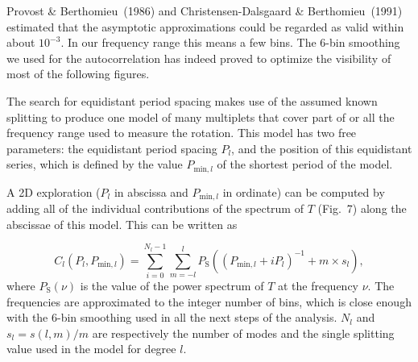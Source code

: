 \documentclass[bibyear]{aa}
\begin{document}
Provost \& Berthomieu~(1986) and Christensen-Dalsgaard \& Berthomieu~(1991) estimated that the asymptotic approximations could be regarded as valid within about $10^{-3}$. In our frequency range this means a few bins. The 6-bin smoothing we used for the autocorrelation has indeed proved to optimize the visibility of most of the following figures.

The search for equidistant period spacing makes use of the assumed known splitting to produce one model of many multiplets that
cover part of or all the frequency range used to measure the rotation. This model has two free parameters: the equidistant period spacing $P_l$, 
and the position of this equidistant series, which is defined by the value $P_{\mathrm{min},l}$ of the shortest period of the model.

A 2D exploration ($P_l$ in abscissa and  $P_{\mathrm{min},l}$ in ordinate) can be computed
 by adding all of the individual contributions of the spectrum  of $T$ (Fig.~7)
along the abscissae of this model. This can be written as  

\begin{equation}\label{eq:Cl}
C_l(P_l,P_{\mathrm{min},l}) = \sum_{i=0}^{N_l-1}\sum_{m=-l}^l P_\mathrm{S}\left((P_{\mathrm{min},l}+i P_l)^{-1} + m\times s_l\right)
,\end{equation}
where $P_\mathrm{S}(\nu)$ is the value of the power spectrum of $T$ at the frequency $\nu$. The frequencies are approximated to the integer number of bins, which is 
close enough with the 6-bin smoothing used in all the next steps of the analysis. $N_l$ and $s_l=s(l,m)/m$ are respectively the number of modes and the single splitting value used in the model for degree $l$.
\end{document}
